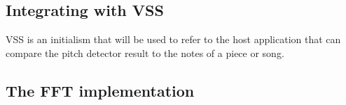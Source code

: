 \subsection{Integrating with VSS}
VSS is an initialism that will be used to refer to the host application that can compare the pitch detector result to the notes of a piece or song. 
\subsection{The FFT implementation}
